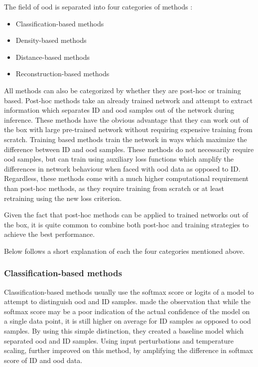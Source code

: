 \documentclass[UKenglish]{uiomasterthesis} %
\theoremstyle{definition}
\begin{document}
The field of \ac{ood} is separated into four categories of methods \cite{oodoverview}:

\begin{itemize}
  \item Classification-based methods
  \item Density-based methods
  \item Distance-based methods
  \item Reconstruction-based methods
\end{itemize}

All methods can also be categorized by whether they are post-hoc or training based. Post-hoc methods take an already trained network and attempt to extract information which separates ID and \ac{ood} samples out of the network during inference. These methods have the obvious advantage that they can work out of the box with large pre-trained network without requiring expensive training from scratch. Training based methods train the network in ways which maximize the difference between ID and \ac{ood} samples. These methods do not necessarily require \ac{ood} samples, but can train using auxiliary loss functions which amplify the differences in network behaviour when faced with \ac{ood} data as opposed to ID. Regardless, these methods come with a much higher computational requirement than post-hoc methods, as they require training from scratch or at least retraining using the new loss criterion. 

Given the fact that post-hoc methods can be applied to trained networks out of the box, it is quite common to combine both post-hoc and training strategies to achieve the best performance.


Below follows a short explanation of each the four categories mentioned above.
\\

\subsubsection{Classification-based methods}

Classification-based methods usually use the softmax score or logits of a model to attempt to distinguish \ac{ood} and ID samples. \cite{oodbaseline} made the observation that while the softmax score may be a poor indication of the actual confidence of the model on a single data point, it is still higher on average for ID samples as opposed to \ac{ood} samples. By using this simple distinction, they created a baseline model which separated \ac{ood} and ID samples. Using input perturbations and temperature scaling, \cite{odin} further improved on this method, by amplifying the difference in softmax score of ID and \ac{ood} data. 
\end{document}
